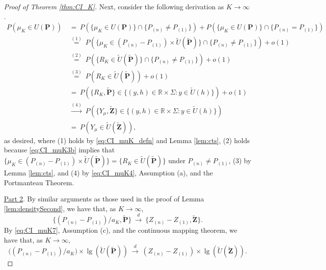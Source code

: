 \begin{proof}[Proof of Theorem \ref{thm:CI_K}]
Next, consider the following derivation as $K\to \infty $.
\begin{align*}
P(\mu _{K}\in U(\mathbf{P}))
& ~=~P(\{ \mu _{K}\in U(\mathbf{P})\} \cap \{ P_{(n)}\not=P_{(1)}\} )+P(\{ \mu _{K}\in U(\mathbf{P} )\} \cap \{ P_{(n)}=P_{(1)}\} ) \\
& ~\overset{(1)}{=}~P(\{ \mu _{K}\in ( P_{(n)}-P_{(1)}) \times \tilde{U}(\mathbf{\tilde{P}})\} \cap \{ P_{(n)}\not=P_{(1)}\} )+o(1) \\
& ~\overset{(2)}{=}~P(\{R_{K}\in \tilde{U}(\mathbf{\tilde{P}})\}\cap \{P_{(n)}\not=P_{(1)}\})+o(1) \\
& ~\overset{(3)}{=}~P(R_{K}\in \tilde{U}(\mathbf{\tilde{P}}))+o(1) \\
& ~=~P(\{R_{K},\mathbf{\tilde{P}}\}\in \{(y,h)\in \mathbb{R}\times \Sigma:y\in \tilde{U}(h)\})+o(1) \\
& ~\overset{(4)}{\to }~P(\{Y_{\mu },\mathbf{\tilde{Z}}\}\in \{(y,h)\in \mathbb{R}\times \Sigma:y\in \tilde{U}(h)\}) \\
& ~=~P(Y_{\mu }\in \tilde{U}(\mathbf{\tilde{Z}})),
\end{align*}
as desired, where (1) holds by \eqref{eq:CI_muK_defn} and Lemma \ref{lem:cts}, (2) holds because \eqref{eq:CI_muK3b} implies that $\{ \mu _{K}\in ( P_{(n)}-P_{(1)}) \times \tilde{U}(\mathbf{\tilde{P}})\} =\{R_{K}\in \tilde{U}(\mathbf{\tilde{P}})\}$ under $P_{(n)}\not=P_{(1)}$, (3) by Lemma \ref{lem:cts}, and (4) by \eqref{eq:CI_muK4}, Assumption (a), and the Portmanteau Theorem.

\underline{Part 2}. By similar arguments as those used in the proof of Lemma \ref{lem:densitySecond}, we have that, as $K\to \infty $,
\begin{equation}
\{{(P_{(n)}-P_{(1)})}/{a_{K}},\mathbf{\tilde{P}}\}~\overset{d}{ \to }~\{Z_{(n)}-Z_{(1)},\mathbf{\tilde{Z}}\}. \label{eq:CI_muK7}
\end{equation}
By \eqref{eq:CI_muK7}, Assumption (c), and the continuous mapping theorem, we have that, as $K\to \infty $, 
\begin{equation}
{((P_{(n)}-P_{(1)})}/{a_{K}}) \times \lg (\tilde{U}(\mathbf{\tilde{P}}))~\overset{d}{ \to }~(Z_{(n)}-Z_{(1)})\times\lg (\tilde{U}(\mathbf{\tilde{Z}})).  \label{eq:CI_muK8}
\end{equation}


\end{proof}
